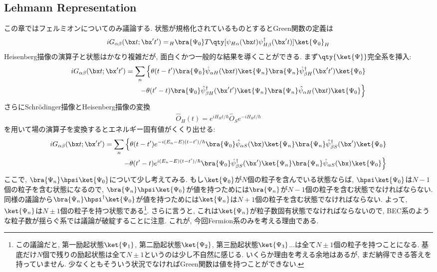 \documentclass[10.5pt,a4paper]{jreport}
\begin{document}
\subsection{Lehmann Representation}
この章ではフェルミオンについてのみ議論する. 状態が規格化されているものとするとGreen関数の定義は
\begin{eqnarray}
  iG_{\alpha\beta}(\bx t;\bx' t') = \!_H\bra{\Psi_0}T\qty[\psi_{H\alpha}(\bx t)\psi_{H\beta}^\dagger(\bx't)]\ket{\Psi_0}_H
\end{eqnarray}
Heisenberg描像の演算子と状態はかなり複雑だが, 面白くかつ一般的な結果を導くことができる. まず$\qty{\ket{\Psi}}$完全系を挿入:
\begin{eqnarray}
  \nonumber  iG_{\alpha\beta}(\bx t;\bx' t') = \sum_n\Big\{\theta(t-t')\bra{\Psi_0}\hat{\psi}_{\alpha H}(\bx t)\ket{\Psi_n}\bra{\Psi_n}\hat{\psi}^\dagger_{\beta H}(\bx't')\ket{\Psi_0}\\
  -\theta(t'-t)\bra{\Psi_0}\hat{\psi}^\dagger_{\beta H}(\bx' t')\ket{\Psi_n}\bra{\Psi_n}\hat{\psi}_{\alpha H}(\bx t)\ket{\Psi_0}\Big\}
\end{eqnarray}
さらにSchr\"odinger描像とHeisenberg描像の変換
\begin{eqnarray}
  \hat{O}_H(t) = e^{iH_Ht/\hbar}\hat{O}_Se^{-iH_Ht/\hbar}
\end{eqnarray}
を用いて場の演算子を変換するとエネルギー固有値がくくり出せる:
\begin{eqnarray}
  \nonumber    iG_{\alpha\beta}(\bx t;\bx' t') = \sum_n\Big\{\theta(t-t')e^{-i(E_n-E)(t-t')/\hbar}\bra{\Psi_0}\hat{\psi}_{\alpha S}(\bx)\ket{\Psi_n}\bra{\Psi_n}\hat{\psi}^\dagger_{\beta S}(\bx')\ket{\Psi_0}\\
  -\theta(t'-t)e^{i(E_n-E)(t-t')/\hbar}\bra{\Psi_0}\hat{\psi}^\dagger_{\beta S}(\bx')\ket{\Psi_n}\bra{\Psi_n}\hat{\psi}_{\alpha S}(\bx)\ket{\Psi_0}\Big\}
\end{eqnarray}
ここで, $\bra{\Psi_n}\hpsi\ket{\Psi_0}$について少し考えてみる. もし$\ket{\Psi_0}$が$N$個の粒子を含んでいる状態ならば, $\hpsi\ket{\Psi_0}$は$N-1$個の粒子を含む状態になるので, $\bra{\Psi_n}\hpsi\ket{\Psi_0}$が値を持つためには$\bra{\Psi_n}$が$N-1$個の粒子を含む状態でなければならない. 同様の議論から$\bra{\Psi_n}\hpsi^\dagger\ket{\Psi_0}$が値を持つためには$\ket{\Psi_n}$は$N+1$個の粒子を含む状態でなければならない. よって, $\ket{\Psi_n}$は$N\pm1$個の粒子を持つ状態である\footnote{この議論だと, 第一励起状態$\ket{\Psi_1}$, 第二励起状態$\ket{\Psi_2}$, 第三励起状態$\ket{\Psi_3}$...は全て$N\pm1$個の粒子を持つことになる. 基底だけ$N$個で残りの励起状態は全て$N\pm1$というのは少し不自然に感じる. いくらか理由を考える余地はあるが, まだ納得できる答えを持っていません. 少なくともそういう状況でなければGreen関数は値を持つことができない. }. さらに言うと, これは$\ket{\Psi_n}$が粒子数固有状態でなければならないので, BEC系のような粒子数が揺らぐ系では議論が破綻することに注意. これが, 今回Fermion系のみを考える理由である. 
\end{document}

